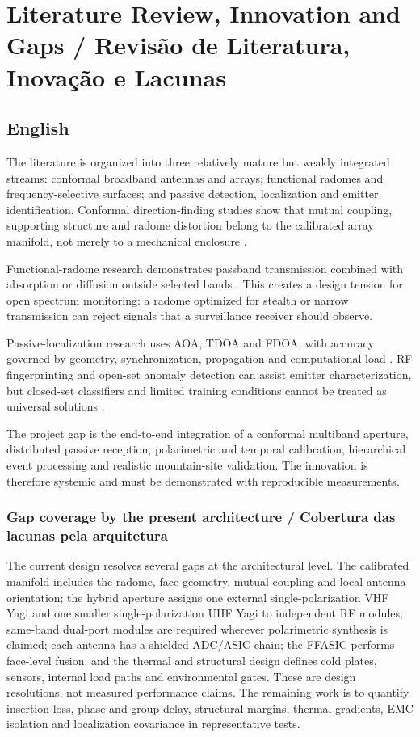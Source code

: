 \chapter{Literature Review, Innovation and Gaps / Revisão de Literatura, Inovação e Lacunas}

\section*{English}
The literature is organized into three relatively mature but weakly integrated streams: conformal broadband antennas and arrays; functional radomes and frequency-selective surfaces; and passive detection, localization and emitter identification. Conformal direction-finding studies show that mutual coupling, supporting structure and radome distortion belong to the calibrated array manifold, not merely to a mechanical enclosure \citep{caratelli2011,liberal2011}.

Functional-radome research demonstrates passband transmission combined with absorption or diffusion outside selected bands \citep{costa2012,lv2021,omar2018,sheng2024}. This creates a design tension for open spectrum monitoring: a radome optimized for stealth or narrow transmission can reject signals that a surveillance receiver should observe.

Passive-localization research uses AOA, TDOA and FDOA, with accuracy governed by geometry, synchronization, propagation and computational load \citep{liu2019,pine2021}. RF fingerprinting and open-set anomaly detection can assist emitter characterization, but closed-set classifiers and limited training conditions cannot be treated as universal solutions \citep{soltanieh2020,jagannath2022,sun2022}.

The project gap is the end-to-end integration of a conformal multiband aperture, distributed passive reception, polarimetric and temporal calibration, hierarchical event processing and realistic mountain-site validation. The innovation is therefore systemic and must be demonstrated with reproducible measurements.

\subsection*{Gap coverage by the present architecture / Cobertura das lacunas pela arquitetura}
The current design resolves several gaps at the architectural level. The calibrated manifold includes the radome, face geometry, mutual coupling and local antenna orientation; the hybrid aperture assigns one external single-polarization VHF Yagi and one smaller single-polarization UHF Yagi to independent RF modules; same-band dual-port modules are required wherever polarimetric synthesis is claimed; each antenna has a shielded ADC/ASIC chain; the FFASIC performs face-level fusion; and the thermal and structural design defines cold plates, sensors, internal load paths and environmental gates. These are design resolutions, not measured performance claims. The remaining work is to quantify insertion loss, phase and group delay, structural margins, thermal gradients, EMC isolation and localization covariance in representative tests.

